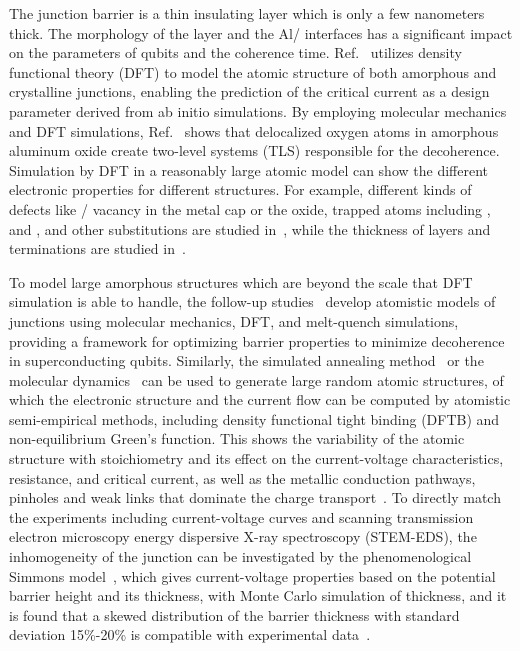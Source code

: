 \documentclass[a4paper,onecolumn,11pt,unpublished]{quantumarticle}
\begin{document}
The junction barrier is a thin  insulating layer which is only a few nanometers thick. The morphology of the  layer and the Al/ interfaces has a significant impact on the parameters of qubits and the coherence time.
Ref.~\cite{Kim2020A} utilizes density functional theory (DFT) to model the atomic structure of both amorphous and crystalline junctions, enabling the prediction of the critical current as a design parameter derived from ab initio simulations.
By employing molecular mechanics and DFT simulations, Ref.~\cite{DuBois2013Delocalized} shows that delocalized oxygen atoms in amorphous aluminum oxide create two-level systems (TLS) responsible for the decoherence. Simulation by DFT in a reasonably large atomic model can show the different electronic properties for different structures. For example, different kinds of defects like / vacancy in the metal cap or the oxide, trapped atoms including ,  and , and other substitutions are studied in~\cite{Reshef2021Method,Qiu2024Manipulation}, while the thickness of  layers and terminations are studied in~\cite{Shan2022Oterminated}. 

To model large amorphous  structures which are beyond the scale that DFT simulation is able to handle, the follow-up studies~\cite{DuBois2015Constructing, Zeng2016Atomic} develop atomistic models of junctions using molecular mechanics, DFT, and melt-quench simulations, providing a framework for optimizing barrier properties to minimize decoherence in superconducting qubits. Similarly, the simulated annealing method~\cite{Hertzberg2021Laserannealing} or the molecular dynamics~\cite{Bayros2024Influence} can be used to generate large random  atomic structures, of which the electronic structure and the current flow can be computed by atomistic semi-empirical methods, including density functional tight binding (DFTB) and non-equilibrium Green's function. 
This shows the variability of the atomic structure with stoichiometry and its effect on the current-voltage characteristics, resistance, and critical current, as well as the metallic conduction pathways, pinholes and weak links that dominate the charge transport~\cite{Lapham2022Computational,Bayros2024Influence}. To directly match the experiments including current-voltage curves and scanning transmission electron microscopy energy dispersive X-ray spectroscopy (STEM-EDS), the inhomogeneity of the junction can be investigated by the phenomenological Simmons model~\cite{Simmons1963Generalized}, which gives current-voltage properties based on the potential barrier height and its thickness, with Monte Carlo simulation of thickness, and it is found that a skewed distribution of the barrier thickness with standard deviation 15\%-20\% is compatible with experimental data~\cite{Kennedy2025Analysis}.
\end{document}
